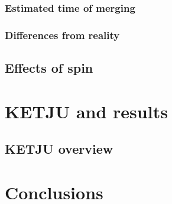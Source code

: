 \documentclass[english, oneside]{HYgradu}
\begin{document}
\subsection{Estimated time of merging}
\subsection{Differences from reality}
\section{Effects of spin}

\chapter{KETJU and results}
\section{KETJU overview}
\section{}
\section{}

\chapter{Conclusions}


\clearpage
{} %

\small

\end{document}
